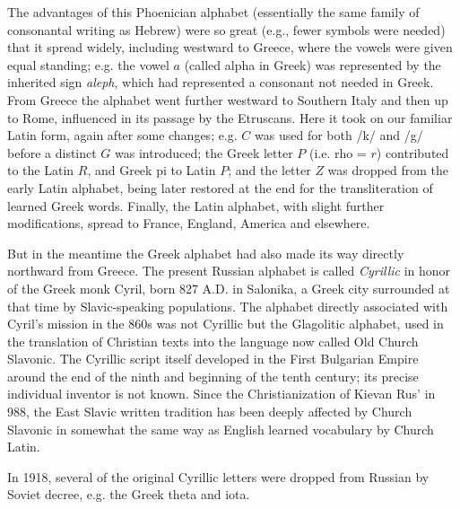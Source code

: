 The advantages of this Phoenician alphabet (essentially the same family of consonantal writing as Hebrew) were so great (e.g., fewer symbols were needed) that it spread widely, including westward to Greece, where the vowels were given equal standing; e.g. the vowel $a$ (called alpha in Greek) was represented by the inherited sign \emph{aleph}, which had represented a consonant not needed in Greek. From Greece the alphabet went further westward to Southern Italy and then up to Rome, influenced in its passage by the Etruscans. Here it took on our familiar Latin form, again after some changes; e.g. $C$ was used for both /k/ and /g/ before a distinct $G$ was introduced; the Greek letter $P$ (i.e. rho = $r$) contributed to the Latin $R$, and Greek pi to Latin $P$; and the letter $Z$ was dropped from the early Latin alphabet, being later restored at the end for the transliteration of learned Greek words. Finally, the Latin alphabet, with slight further modifications, spread to France, England, America and elsewhere.

But in the meantime the Greek alphabet had also made its way directly northward from Greece. The present Russian alphabet is called \emph{Cyrillic} in honor of the Greek monk Cyril, born 827 A.D. in Salonika, a Greek city surrounded at that time by Slavic-speaking populations. The alphabet directly associated with Cyril's mission in the 860s was not Cyrillic but the Glagolitic alphabet, used in the translation of Christian texts into the language now called Old Church Slavonic. The Cyrillic script itself developed in the First Bulgarian Empire around the end of the ninth and beginning of the tenth century; its precise individual inventor is not known. Since the Christianization of Kievan Rus' in 988, the East Slavic written tradition has been deeply affected by Church Slavonic in somewhat the same way as English learned vocabulary by Church Latin.

In 1918, several of the original Cyrillic letters were dropped from Russian by Soviet decree, e.g. the Greek theta and iota.

